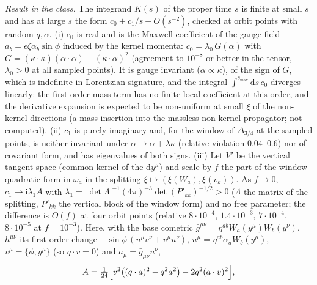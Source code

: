 \emph{Result in the class.} The integrand \(K(s)\) of the proper time \(s\) is finite at small \(s\) and has at large \(s\) the form \(c_0+c_1/s+O(s^{-2})\), checked at orbit points with random \(q,\alpha\). (i) \(c_0\) is real and is the Maxwell coefficient of the gauge field \(a_b=\epsilon\zeta\alpha_b\sin\phi\) induced by the kernel momenta: \(c_0=\lambda_0\,G(\alpha)\) with \(G=(\kappa\cdot\kappa)(\alpha\cdot\alpha)-(\kappa\cdot\alpha)^2\) (agreement to \(10^{-8}\) or better in the tensor, \(\lambda_0>0\) at all sampled points). It is gauge invariant (\(\alpha\propto\kappa\)), of the sign of \(G\), which is indefinite in Lorentzian signature, and the integral \(\int^{s_{\max}}\mathrm ds\,c_0\) diverges linearly: the first-order mass term has no finite local coefficient at this order, and the derivative expansion is expected to be non-uniform at small \(\xi\) of the non-kernel directions (a mass insertion into the massless non-kernel propagator; not computed). (ii) \(c_1\) is purely imaginary and, for the window of \(\Delta_{3/4}\) at the sampled points, is neither invariant under \(\alpha\to\alpha+\lambda\kappa\) (relative violation \(0.04\)--\(0.6\)) nor of covariant form, and has eigenvalues of both signs. (iii) Let \(V'\) be the vertical tangent space (common kernel of the \(\mathrm dy^\mu\)) and scale by \(f\) the part of the window quadratic form in \(\omega_a\) in the splitting \(\xi\mapsto(\xi(W_a),\xi(v_k))\). As \(f\to0\), \(c_1\to\mathrm i\lambda_1 A\) with \(\lambda_1=|\det\Lambda|^{-1}(4\pi)^{-3}\det(P'_{kk})^{-1/2}>0\) (\(\Lambda\) the matrix of the splitting, \(P'_{kk}\) the vertical block of the window form) and no free parameter; the difference is \(O(f)\) at four orbit points (relative \(8\cdot10^{-4}\), \(1.4\cdot10^{-3}\), \(7\cdot10^{-4}\), \(8\cdot10^{-5}\) at \(f=10^{-3}\)). Here, with the base cometric \(\bar g^{\mu\nu}=\eta^{ab}W_a(y^\mu)W_b(y^\nu)\), \(h^{\mu\nu}\) its first-order change \(-\sin\phi\,(u^\mu v^\nu+v^\mu u^\nu)\), \(u^\mu=\eta^{ab}\alpha_aW_b(y^\mu)\), \(v^\mu=\{\phi,y^\mu\}\) (so \(q\cdot v=0\)) and \(a_\mu=\bar g_{\mu\nu}u^\nu\),
\[
A=\tfrac1{24}\Bigl[v^2\bigl((q\cdot a)^2-q^2a^2\bigr)-2q^2(a\cdot v)^2\Bigr],
\]
